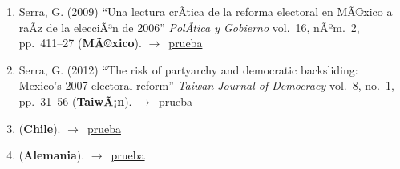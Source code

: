 \documentclass[12 pt, letter]{article}
\newenvironment{CitasMiTrabajo}{
    \begin{footnotesize}
    \begin{enumerate}[label={\footnotesize\emph{cita~\arabic*}},ref=\arabic*] %
        \setlength{\itemsep}{.1\itemsep}
        \setlength{\parskip}{.1\parskip}
    }{\end{enumerate}\end{footnotesize}}
\begin{document}
        \begin{CitasMiTrabajo}

        \item Serra, G. (2009)
        ``Una lectura crÃ­tica de la reforma electoral en MÃ©xico a raÃ­z de la elecciÃ³n de 2006''
        \emph{PolÃ­tica y Gobierno} vol.\ 16, nÃºm.\ 2, pp.\ 411--27
        (\textbf{MÃ©xico}). $\rightarrow$~\href{http://ericmagar.com/cv/cites/magarRomero2007rcp/serra2009pyg.pdf}{prueba}

        \item Serra, G. (2012)
            ``The risk of partyarchy and democratic backsliding: Mexico's 2007 electoral reform''
            \emph{Taiwan Journal of Democracy}
            vol.\ 8, no.\ 1, pp.\ 31--56 (\textbf{TaiwÃ¡n}). $\rightarrow$~\href{http://ericmagar.com/cv/cites/estevezEtalElecStud/serraElecRefMexico2012tjd.pdf}{prueba}

        \item {} (\textbf{Chile}). $\rightarrow$~\href{http://ericmagar.com/cv/cites/magarRomero2007rcp/hdzhdzGeoespacialElecFCH2015.pdf}{prueba}

        \item {} (\textbf{Alemania}). $\rightarrow$~\href{http://ericmagar.com/cv/cites/magarRomero2007rcp/heisig2015.pdf}{prueba}

        \label{ncites:magar.romero.rcp.2007} %

        \end{CitasMiTrabajo}



\end{document}
